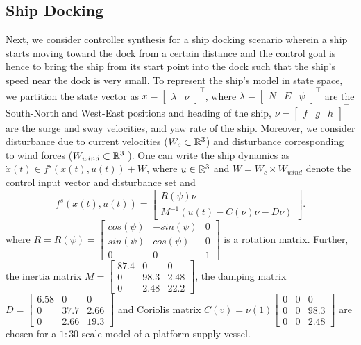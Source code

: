 \subsection{Ship Docking}\label{subsec:6dship}
Next, we consider controller synthesis for a ship docking scenario wherein a ship starts moving toward the dock from a certain distance and the control goal is hence to bring the ship from its start point into the dock such that the ship's speed near the dock is very small. To represent the ship's model in state space, we partition the state vector as $x=\begin{bmatrix}\lambda& \nu\end{bmatrix}^\top$, where $\lambda=\begin{bmatrix}N&E&\psi\end{bmatrix}^\top$ are the South-North and West-East positions and heading of the ship, $\nu = \begin{bmatrix}f &g &h\end{bmatrix}^\top$ are the surge and sway velocities, and yaw rate of the ship. Moreover, we consider disturbance due to current velocities ($W_c\subset\mathbb{R}^3$) and disturbance corresponding to wind forces ($W_{wind}\subset\mathbb{R}^3$ ). One can write the ship dynamics as $\dot x(t)\in f^s(x(t),u(t))+W$, where $u\in\mathbb{R}^3$ and $W=W_c\times W_{wind}$ denote the control input vector and disturbance set and
\begin{equation}\label{eq:ship_ss}
f^{s}(x(t),u(t))=\begin{bmatrix}R(\psi)\nu\\M^{-1}(u(t)-C(\nu)\nu-D\nu)\end{bmatrix}.
\end{equation}
where $R=R(\psi)=\begin{bmatrix}
cos(\psi) &-sin(\psi) &0\\
sin(\psi) & cos(\psi) & 0\\
0 & 0 & 1
\end{bmatrix}$ is a rotation matrix. Further, the inertia matrix $M=\begin{bmatrix}
87.4 & 0 & 0 \\
0 & 98.3 & 2.48 \\
0 & 2.48 & 22.2
\end{bmatrix}$, the damping matrix $D=\begin{bmatrix}
6.58 & 0 & 0 \\
0 & 37.7 & 2.66 \\
0 & 2.66 & 19.3
\end{bmatrix}$ and Coriolis matrix $C(v)=\nu(1)\begin{bmatrix}
0 & 0 & 0 \\
0 & 0 & 98.3 \\
0 & 0 & 2.48
\end{bmatrix}$ are chosen for a $1:30$ scale model of a platform supply vessel.

